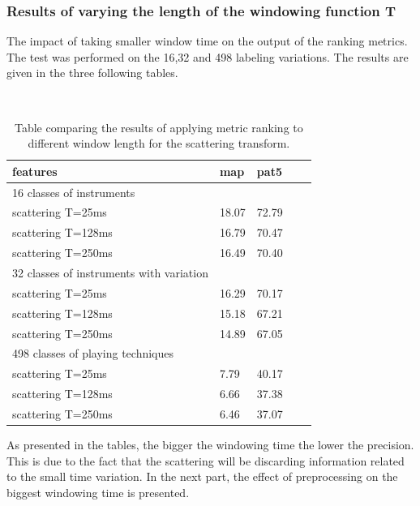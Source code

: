\documentclass[hidelinks,12pt]{report}
\begin{document}
\subsubsection{Results of varying the length of the windowing function T}
The impact of taking smaller window time on the output of the ranking metrics. The test was performed on the 16,32 and 498 labeling variations. The results are given in the three following tables.
\begin{table} [H]
\begin{center} 
\ 
 \setlength{\tabcolsep}{.16667em} 
\begin{tabular}{ | l | l | l | l | l |}

features  & map & pat5  \\ 
\hline 
\hline
16 classes of instruments\\
\hline
scattering T=25ms & 18.07 & 72.79  \\ 
 
scattering T=128ms  & 16.79 & 70.47  \\ 

scattering T=250ms  & 16.49 & 70.40  \\ \hline
32 classes of instruments with variation\\
\hline
scattering T=25ms  & 16.29 & 70.17  \\ 

scattering T=128ms  & 15.18 & 67.21  \\ 

scattering T=250ms  & 14.89 & 67.05  \\ \hline
498 classes of playing techniques \\
\hline
scattering T=25ms   &  7.79 & 40.17  \\ 

scattering T=128ms  &  6.66 & 37.38 \\ 

scattering T=250ms  &  6.46 & 37.07 \\ 

\end{tabular} 
\end{center} 
\caption{Table comparing the results of applying metric ranking to different window length for the scattering transform.} 
\label{you} 
\end{table}

As presented in the tables, the bigger the windowing time the lower the precision. This is due to the fact that the scattering will be discarding information related to the small time variation. In the next part, the effect of preprocessing on the biggest windowing time is presented.
\end{document}
